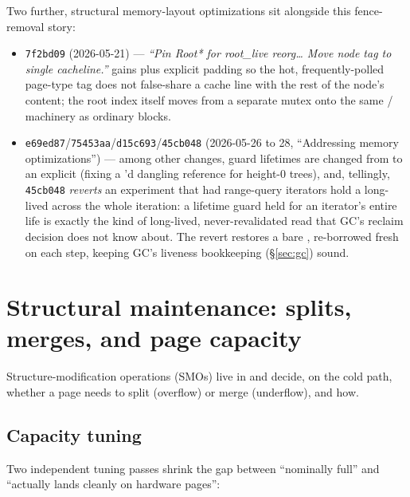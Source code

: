 \documentclass[11pt]{article}
\newcommand{\commit}[1]{\texttt{#1}}
\begin{document}
Two further, structural memory-layout optimizations sit alongside this fence-removal
story:

\begin{itemize}
  \item \commit{7f2bd09} (2026-05-21) --- \emph{``Pin Root* for root\_live reorg\ldots
        Move node tag to single cacheline.''}  gains
         plus explicit padding so the hot, frequently-polled
        page-type tag does not false-share a cache line with the rest of the node's
        content; the root index itself moves from a separate  mutex
        onto the same / machinery as ordinary blocks.
  \item \commit{e69ed87}/\commit{75453aa}/\commit{d15c693}/\commit{45cb048} (2026-05-26
        to 28, ``Addressing memory optimizations'') --- among other changes, guard
        lifetimes are changed from  to an explicit  (fixing a
        'd dangling reference for height-0 trees), and, tellingly,
        \commit{45cb048} \emph{reverts} an experiment that had range-query iterators hold
        a long-lived  across the whole iteration: a 
        lifetime guard held for an iterator's entire life is exactly the kind of
        long-lived, never-revalidated read that GC's reclaim decision does not know
        about. The revert restores a bare , re-borrowed fresh on each
        step, keeping GC's liveness bookkeeping (\S\ref{sec:gc}) sound.
\end{itemize}

\section{Structural maintenance: splits, merges, and page capacity}
\label{sec:smo}

Structure-modification operations (SMOs) live in  and decide,
on the cold path, whether a page needs to split (overflow) or merge (underflow), and how.

\subsection{Capacity tuning}

Two independent tuning passes shrink the gap between ``nominally full'' and ``actually
lands cleanly on hardware pages'':
\end{document}
